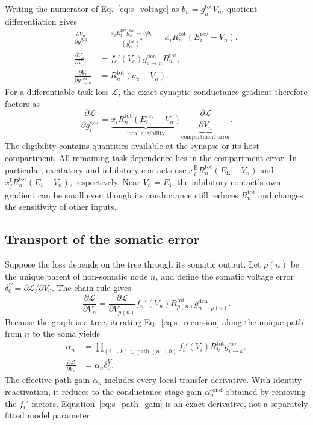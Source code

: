 Writing the numerator of Eq.~\ref{eq:s_voltage} as
$b_n=g_n^{\mathrm{tot}}V_n$, quotient differentiation gives
\begin{align}
\frac{\partial V_n}{\partial g_i^{\mathrm{syn}}}
&=\frac{x_iE_i^{\mathrm{rev}} g_n^{\mathrm{tot}}-x_i b_n}
        {(g_n^{\mathrm{tot}})^2}
=x_iR_n^{\mathrm{tot}}(E_i^{\mathrm{rev}}-V_n),
\label{eq:s_syn_sensitivity}\\
\frac{\partial V_n}{\partial V_c}
&=f_c'(V_c)g_{c\to n}^{\mathrm{den}}R_n^{\mathrm{tot}},
\label{eq:s_transfer_sensitivity}\\
\frac{\partial V_n}{\partial g_{c\to n}^{\mathrm{den}}}
&=R_n^{\mathrm{tot}}(a_c-V_n).
\label{eq:s_coupling_sensitivity}
\end{align}
For a differentiable task loss $\mathcal L$, the exact synaptic
conductance gradient therefore factors as
\begin{equation}
\frac{\partial\mathcal L}{\partial g_i^{\mathrm{syn}}}
=\underbrace{x_iR_n^{\mathrm{tot}}(E_i^{\mathrm{rev}}-V_n)}_{\text{local eligibility}}
\underbrace{\frac{\partial\mathcal L}{\partial V_n}}_{\text{compartment error}}.
\label{eq:s_factorization}
\end{equation}
The eligibility contains quantities available at the synapse or its host
compartment. All remaining task dependence lies in the compartment error. In
particular, excitatory and inhibitory contacts use
\(x_i^{\mathrm E}R_n^{\mathrm{tot}}(E_{\mathrm E}-V_n)\) and
\(x_j^{\mathrm I}R_n^{\mathrm{tot}}(E_{\mathrm I}-V_n)\), respectively.
Near \(V_n=E_{\mathrm I}\), the inhibitory contact's own gradient can be small
even though its conductance still reduces \(R_n^{\mathrm{tot}}\) and changes
the sensitivity of other inputs.

\subsection{Transport of the somatic error}

Suppose the loss depends on the tree through its somatic output. Let $p(n)$
be the unique parent of non-somatic node $n$, and define the somatic voltage
error $\delta_0^V=\partial\mathcal L/\partial V_0$. The chain rule gives
\begin{equation}
\frac{\partial\mathcal L}{\partial V_n}
=\frac{\partial\mathcal L}{\partial V_{p(n)}}
 f_n'(V_n)R_{p(n)}^{\mathrm{tot}}g_{n\to p(n)}^{\mathrm{den}}.
\label{eq:s_recursion}
\end{equation}
Because the graph is a tree, iterating Eq.~\ref{eq:s_recursion} along the
unique path from $n$ to the soma yields
\begin{align}
\widetilde\alpha_n
&=\prod_{(i\to k)\in\operatorname{path}(n\to0)}
 f_i'(V_i)R_k^{\mathrm{tot}}g_{i\to k}^{\mathrm{den}},\\
\frac{\partial\mathcal L}{\partial V_n}
&=\widetilde\alpha_n\delta_0^V.
\label{eq:s_path_gain}
\end{align}
The effective path gain $\widetilde\alpha_n$ includes every local transfer
derivative. With identity reactivation, it reduces to the conductance-stage
gain $\alpha_n^{\mathrm{cond}}$ obtained by removing the $f_i'$ factors.
Equation~\ref{eq:s_path_gain} is an exact derivative, not a separately fitted
model parameter.

